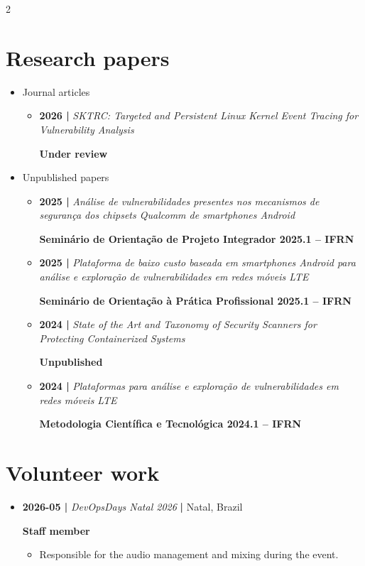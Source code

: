 \documentclass[a4paper,10pt]{article}
\begin{document}
\begin{multicols*}{2}
\section*{Research papers}
\label{sec:orged00274}
\begin{itemize}
\item Journal articles
\begin{itemize}
\item \textbf{2026 |} \emph{SKTRC: Targeted and Persistent Linux Kernel Event Tracing for
Vulnerability Analysis}

\textbf{Under review}
\end{itemize}

\item Unpublished papers
\begin{itemize}
\item \textbf{2025 |} \emph{Análise de vulnerabilidades presentes nos mecanismos de segurança
dos chipsets Qualcomm de smartphones Android}

\textbf{Seminário de Orientação de Projeto Integrador 2025.1 -- IFRN}

\item \textbf{2025 |} \emph{Plataforma de baixo custo baseada em smartphones Android para
análise e exploração de vulnerabilidades em redes móveis LTE}

\textbf{Seminário de Orientação à Prática Profissional 2025.1 -- IFRN}

\item \textbf{2024 |} \emph{State of the Art and Taxonomy of Security Scanners for Protecting
Containerized Systems}

\textbf{Unpublished}

\item \textbf{2024 |} \emph{Plataformas para análise e exploração de vulnerabilidades em redes
móveis LTE}

\textbf{Metodologia Científica e Tecnológica 2024.1 -- IFRN}
\end{itemize}
\end{itemize}
\section*{Volunteer work}
\label{sec:orgfaf789a}
\begin{itemize}
\item \textbf{2026-05 |} \emph{DevOpsDays Natal 2026} \textbf{|} Natal, Brazil

\textbf{Staff member}
\begin{itemize}
\item Responsible for the audio management and mixing during the event.
\end{itemize}


\end{itemize}
\end{multicols*}
\end{document}
